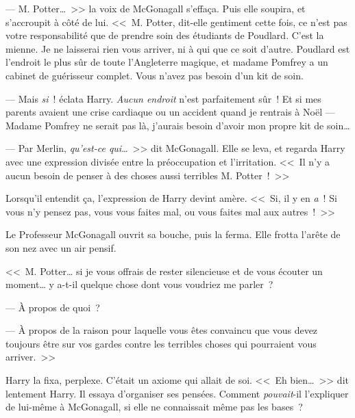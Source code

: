 --- M. Potter…~>> la voix de McGonagall s'effaça. Puis elle soupira, et s'accroupit à côté de lui. <<~M. Potter, dit-elle gentiment cette fois, ce n'est pas votre responsabilité que de prendre soin des étudiants de Poudlard. C'est la mienne. Je ne laisserai rien vous arriver, ni à qui que ce soit d'autre. Poudlard est l'endroit le plus sûr de toute l'Angleterre magique, et madame Pomfrey a un cabinet de guérisseur complet. Vous n'avez pas besoin d'un kit de soin.

--- Mais \emph{si}~! éclata Harry. \emph{Aucun endroit} n'est parfaitement sûr~! Et si mes parents avaient une crise cardiaque ou un accident quand je rentrais à Noël — Madame Pomfrey ne serait pas là, j'aurais besoin d'avoir mon propre kit de soin…

--- Par Merlin, \emph{qu'est-ce qui}…~>> dit McGonagall. Elle se leva, et regarda Harry avec une expression divisée entre la préoccupation et l'irritation. <<~Il n'y a aucun besoin de penser à des choses aussi terribles M. Potter~!~>>

Lorsqu'il entendit ça, l'expression de Harry devint amère. <<~Si, il y en \emph{a}~! Si vous n'y pensez pas, vous vous faites mal, ou vous faites mal aux autres~!~>>

Le Professeur McGonagall ouvrit sa bouche, puis la ferma. Elle frotta l'arête de son nez avec un air pensif. 

<<~M. Potter… si je vous offrais de rester silencieuse et de vous écouter un moment… y a-t-il quelque chose dont vous voudriez me parler~?

--- À propos de quoi~?

--- À propos de la raison pour laquelle vous êtes convaincu que vous devez toujours être sur vos gardes contre les terribles choses qui pourraient vous arriver.~>>

Harry la fixa, perplexe. C'était un axiome qui allait de soi. <<~Eh bien…~>> dit lentement Harry. Il essaya d'organiser ses pensées. Comment \emph{pouvait}-il l'expliquer de lui-même à McGonagall, si elle ne connaissait même pas les bases~?


